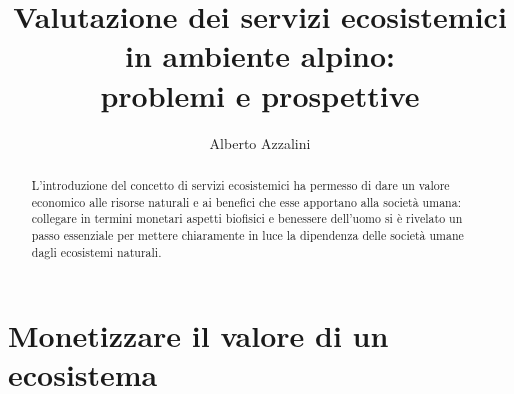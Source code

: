 \documentclass[12pt,a4paper]{article}
\author{Alberto Azzalini}
\title{Valutazione dei servizi ecosistemici in ambiente alpino:\\ problemi e prospettive}
\begin{document}
	\maketitle
	\begin{abstract}
		L'introduzione del concetto di servizi ecosistemici ha permesso di dare un valore economico alle risorse naturali e ai benefici che esse apportano alla società umana: collegare in termini monetari aspetti biofisici e benessere dell'uomo si è rivelato un passo essenziale per mettere chiaramente in luce la dipendenza delle società umane dagli ecosistemi naturali.
	\end{abstract}
	\section{Monetizzare il valore di un ecosistema}
	
\end{document}
